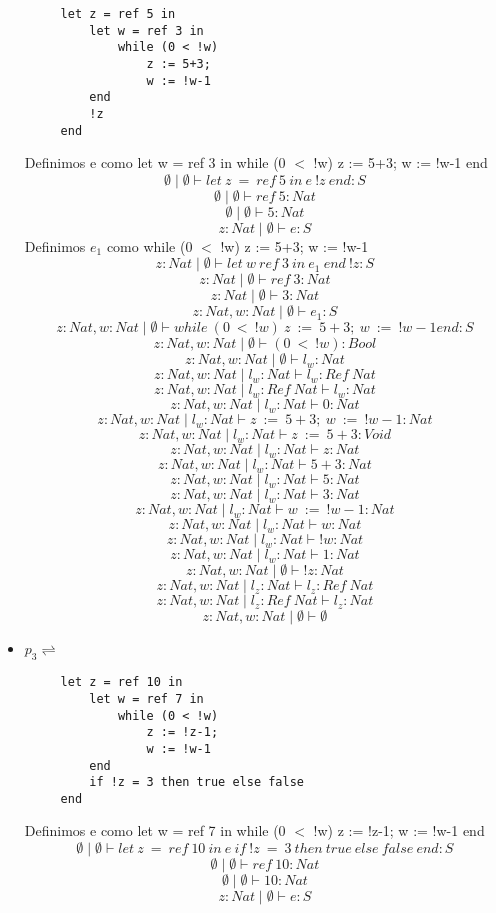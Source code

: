 \documentclass[11pt, a4paper]{report}
\begin{document}
\begin{itemize}
		\begin{lstlisting}
	 let z = ref 5 in
	 	 let w = ref 3 in
	 	     while (0 < !w)
	 	         z := 5+3;
	 	         w := !w-1
	 	 end
	 	 !z
	 end
		\end{lstlisting}
		Definimos e como let w = ref 3 in while (0 $<$ !w) z := 5+3; w := !w-1 end
		$$ \emptyset \mid \emptyset \vdash let\ z\ =\ ref\ 5\ in\ e\ !z\ end:S $$
		$$ \emptyset \mid \emptyset \vdash ref\ 5:Nat $$
		$$ \emptyset \mid \emptyset \vdash 5:Nat $$
		$$ z:Nat\mid \emptyset \vdash e:S $$
		Definimos $e_{1}$ como while (0 $<$ !w) z := 5+3; w := !w-1
		$$ z:Nat\mid \emptyset \vdash let\ w\ ref\ 3\ in\ e_{1}\ end\ !z:S $$
		$$ z:Nat\mid \emptyset \vdash ref\ 3:Nat $$
		$$ z:Nat\mid \emptyset \vdash 3:Nat $$
		$$ z:Nat,w:Nat\mid \emptyset \vdash e_{1}:S$$
		$$ z:Nat,w:Nat\mid \emptyset \vdash while\ (0\ <\ !w)\ z\ :=\ 5+3;\ w\ :=\ !w-1 end:S $$
		$$ z:Nat,w:Nat\mid \emptyset \vdash (0\ <\ !w):Bool $$		
		$$ z:Nat,w:Nat\mid \emptyset \vdash l_{w}:Nat $$
		$$ z:Nat,w:Nat\mid l_{w}:Nat \vdash l_{w}:Ref\ Nat $$
		$$ z:Nat,w:Nat\mid l_{w}:Ref\ Nat \vdash l_{w}:Nat $$
		$$ z:Nat,w:Nat\mid l_{w}:Nat \vdash 0:Nat $$
		$$ z:Nat,w:Nat\mid l_{w}:Nat \vdash z\ :=\ 5+3;\ w\ :=\ !w-1:Nat $$
		$$ z:Nat,w:Nat\mid l_{w}:Nat \vdash z\ :=\ 5+3:Void $$
		$$ z:Nat,w:Nat\mid l_{w}:Nat \vdash z:Nat $$
		$$ z:Nat,w:Nat\mid l_{w}:Nat \vdash 5+3:Nat $$
		$$ z:Nat,w:Nat\mid l_{w}:Nat \vdash 5:Nat $$
		$$ z:Nat,w:Nat\mid l_{w}:Nat \vdash 3:Nat $$
		$$ z:Nat,w:Nat\mid l_{w}:Nat \vdash w\ :=\ !w-1:Nat $$
		$$ z:Nat,w:Nat\mid l_{w}:Nat \vdash w:Nat $$
		$$ z:Nat,w:Nat\mid l_{w}:Nat \vdash !w:Nat $$
		$$ z:Nat,w:Nat\mid l_{w}:Nat \vdash 1:Nat $$
		$$ z:Nat,w:Nat\mid \emptyset \vdash !z:Nat $$
		$$ z:Nat,w:Nat\mid l_{z}:Nat \vdash l_{z}:Ref\ Nat $$
		$$ z:Nat,w:Nat\mid l_{z}:Ref\ Nat \vdash l_{z}:Nat $$
		$$ z:Nat,w:Nat\mid \emptyset \vdash \emptyset $$
	\item $p_{3} \rightleftharpoons$
		\begin{lstlisting}
	 let z = ref 10 in
	     let w = ref 7 in
	         while (0 < !w)
	             z := !z-1;
	             w := !w-1
	     end
	     if !z = 3 then true else false
	 end
		\end{lstlisting}
		Definimos e como let w = ref 7 in while (0 $<$ !w) z := !z-1; w := !w-1 end\\
		$$ \emptyset \mid \emptyset \vdash let\ z\ =\ ref\ 10\ in\ e\ if\ !z\ =\ 3\ then\ true\ else\ false\ end:S$$
		$$ \emptyset \mid \emptyset \vdash ref\ 10:Nat $$
		$$ \emptyset \mid \emptyset \vdash 10:Nat $$
		$$ z:Nat\mid \emptyset \vdash e:S$$

\end{itemize}
\end{document}

